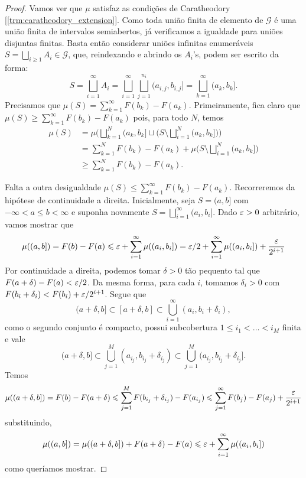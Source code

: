 \begin{proof}
	Vamos ver que $\mu$ satisfaz as condições de Caratheodory
	[\ref{trm:caratheodory_extension}]. Como toda união
	finita de elemento de $\mathcal{G}$ é uma união finita de intervalos
	semiabertos, já verificamos a igualdade para
	uniões disjuntas finitas. Basta então considerar uniões infinitas
	enumeráveis $S = \bigsqcup_{i \geq 1} A_i \in \mathcal{G}$,
	que, reindexando e abrindo os $A_i$'s, podem ser escrito da forma:
	\[
		S = \bigsqcup_{i = 1}^\infty A_i = \bigsqcup_{i = 1}^{\infty}
		\bigsqcup_{j = 1}^{n_i} (a_{i,j},b_{i,j}]
		= \bigsqcup_{k = 1}^{\infty} (a_k, b_k].
	\]
	Precisamos que $\mu(S) = \sum_{k = 1}^{\infty} F(b_k) - F(a_k)$.
	Primeiramente, fica claro que
	$\mu(S) \geq \sum_{k = 1}^{\infty} F(b_k) - F(a_k)$ pois, para todo $N$, temos
	\begin{align*}
		\mu(S) &= \mu\bigg(\bigsqcup_{k = 1}^{N}(a_k, b_k] \sqcup \bigg(S
		\setminus \bigsqcup_{i = 1}^{N} (a_k, b_k] \bigg) \bigg)\\
		&= \sum_{k = 1}^N F(b_k) - F(a_k) + \mu\bigg(S \setminus
		\bigsqcup_{i = 1}^{N} (a_k, b_k]\bigg)\\
		&\geq \sum_{k = 1}^N F(b_k) - F(a_k).
	\end{align*}

	Falta a outra desigualdade $\mu(S) \leq \sum_{k = 1}^{\infty} F(b_k)
	- F(a_k)$. Recorreremos
	da hipótese de continuidade a direita. Inicialmente, seja $S = (a,
	b]$ com $-\infty < a \leq b < \infty$
	e suponha novamente $S = \bigsqcup_{i=1}^{\infty} (a_i,b_i]$. Dado $\varepsilon > 0$
	arbitrário, vamos mostrar que
	\[
		\mu((a,b]) = F(b) - F(a) \leqslant \varepsilon + \sum_{i = 1}^{\infty}
		\mu((a_i,b_i]) = \varepsilon/2 + \sum_{i = 1}^{\infty} \mu((a_i,b_i]) +
		\frac{\varepsilon}{2^{i+1}}
	\]
	Por continuidade a direita, podemos tomar $\delta > 0$ tão pequento
	tal que $F(a+\delta) - F(a) < \varepsilon/2$.
	Da mesma forma, para cada $i$, tomamos $\delta_i > 0$ com $F(b_i +
	\delta_i) < F(b_i) + \varepsilon/2^{i+1}$. Segue que
	\[
		(a+ \delta, b] \subset [a + \delta, b] \subset \bigcup_{i=1}^\infty
		(a_i, b_i + \delta_i),
	\]
	como o segundo conjunto é compacto, possui subcobertura $1 \leq i_1
	< \dots <i_M$ finita e vale
	\[
		(a + \delta, b] \subset \bigcup_{j=1}^{M} (a_{i_j}, b_{i_j} +
		\delta_{i_j}) \subset \bigcup_{j=1}^{M} (a_{i_j}, b_{i_j} + \delta_{i_j}].
	\]
	Temos
	\begin{equation}
		\label{exer:eq:cebola}
		\mu((a+\delta, b]) = F(b) - F(a + \delta) \leqslant \sum_{j=1}^{M}
		F(b_{i_j} + \delta_{i_j}) - F(a_{i_j}) \leqslant \sum_{j=1}^{\infty}
		F(b_j) - F(a_j) + \frac{\varepsilon}{2^{i+1}}
	\end{equation}
	substituindo,
	\[
		\mu((a,b]) = \mu((a + \delta, b]) + F(a + \delta) - F(a) \leqslant \varepsilon
		+ \sum_{i = 1}^{\infty} \mu((a_i,b_i])
	\]
	como queríamos mostrar.


\end{proof}
